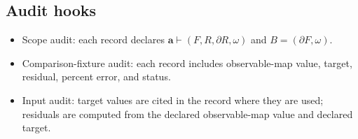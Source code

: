 
\subsection{Audit hooks}\label{manual:solar:audit-hooks}
\begin{itemize}
\item Scope audit: each record declares \(\mathbf a\vdash(F,R,\partial R,\omega)\) and \(B=(\partial F,\omega)\).
\item Comparison-fixture audit: each record includes observable-map value, target, residual, percent error, and status.
\item Input audit: target values are cited in the record where they are used; residuals are computed from the declared observable-map value and declared target.
\end{itemize}

